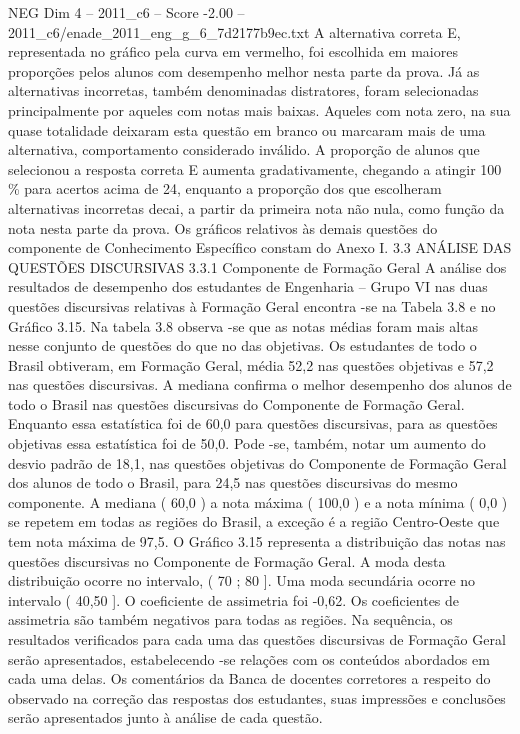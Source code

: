 \begin{textsample}{NEG Dim 4 – 2011\_c6 – Score -2.00 – 2011\_c6/enade\_2011\_eng\_g\_6\_7d2177b9ec.txt}
A alternativa correta E, representada no gráfico pela curva em vermelho, foi escolhida em maiores proporções pelos alunos com desempenho melhor nesta parte da prova.
Já as alternativas incorretas, também denominadas distratores, foram selecionadas principalmente por aqueles com notas mais baixas.
Aqueles com nota zero, na sua quase totalidade deixaram esta questão em branco ou marcaram mais de uma alternativa, comportamento considerado inválido.
A proporção de alunos que selecionou a resposta correta E aumenta gradativamente, chegando a atingir 100 \% para acertos acima de 24, enquanto a proporção dos que escolheram alternativas incorretas decai, a partir da primeira nota não nula, como função da nota nesta parte da prova.
Os gráficos relativos às demais questões do componente de Conhecimento Específico constam do Anexo I. 3.3 ANÁLISE DAS QUESTÕES DISCURSIVAS 3.3.1 Componente de Formação Geral A análise dos resultados de desempenho dos estudantes de Engenharia – Grupo VI nas duas questões discursivas relativas à Formação Geral encontra -se na Tabela 3.8 e no Gráfico 3.15.
Na tabela 3.8 observa -se que as notas médias foram mais altas nesse conjunto de questões do que no das objetivas.
Os estudantes de todo o Brasil obtiveram, em Formação Geral, média 52,2 nas questões objetivas e 57,2 nas questões discursivas.
A mediana confirma o melhor desempenho dos alunos de todo o Brasil nas questões discursivas do Componente de Formação Geral.
Enquanto essa estatística foi de 60,0 para questões discursivas, para as questões objetivas essa estatística foi de 50,0.
Pode -se, também, notar um aumento do desvio padrão de 18,1, nas questões objetivas do Componente de Formação Geral dos alunos de todo o Brasil, para 24,5 nas questões discursivas do mesmo componente.
A mediana ( 60,0 ) a nota máxima ( 100,0 ) e a nota mínima ( 0,0 ) se repetem em todas as regiões do Brasil, a exceção é a região Centro-Oeste que tem nota máxima de 97,5.
O Gráfico 3.15 representa a distribuição das notas nas questões discursivas no Componente de Formação Geral.
A moda desta distribuição ocorre no intervalo, ( 70 ; 80 ].
Uma moda secundária ocorre no intervalo ( 40,50 ].
O coeficiente de assimetria foi -0,62.
Os coeficientes de assimetria são também negativos para todas as regiões.
Na sequência, os resultados verificados para cada uma das questões discursivas de Formação Geral serão apresentados, estabelecendo -se relações com os conteúdos abordados em cada uma delas.
Os comentários da Banca de docentes corretores a respeito do observado na correção das respostas dos estudantes, suas impressões e conclusões serão apresentados junto à análise de cada questão.

\end{textsample}
